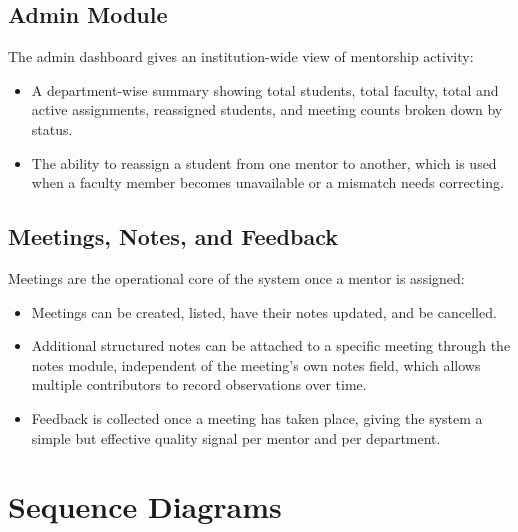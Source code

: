 \documentclass[12pt,a4paper]{report}
\newcommand{\sectionrule}{\vspace{-4pt}{\color{lightgray}\hrule height 1pt}\vspace{8pt}}
\begin{document}
\section{Admin Module}
\sectionrule
The admin dashboard gives an institution-wide view of mentorship activity:
\begin{itemize}[itemsep=2pt]
  \item A department-wise summary showing total students, total faculty, total and active assignments, reassigned students, and meeting counts broken down by status.
  \item The ability to reassign a student from one mentor to another, which is used when a faculty member becomes unavailable or a mismatch needs correcting.
\end{itemize}

\section{Meetings, Notes, and Feedback}
\sectionrule
Meetings are the operational core of the system once a mentor is assigned:
\begin{itemize}[itemsep=2pt]
  \item Meetings can be created, listed, have their notes updated, and be cancelled.
  \item Additional structured notes can be attached to a specific meeting through the notes module, independent of the meeting's own notes field, which allows multiple contributors to record observations over time.
  \item Feedback is collected once a meeting has taken place, giving the system a simple but effective quality signal per mentor and per department.
\end{itemize}

\chapter{Sequence Diagrams}
\end{document}
